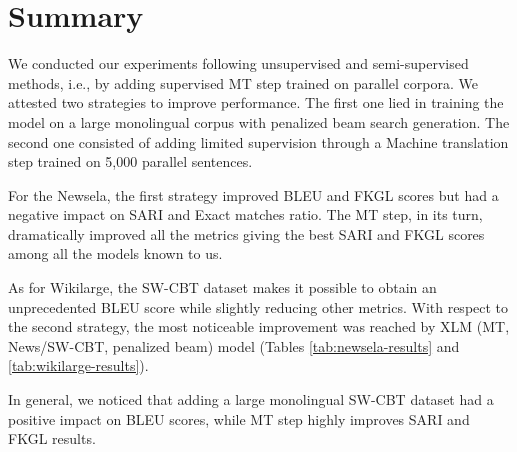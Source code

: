 \section{Summary}

We conducted our experiments following unsupervised and semi-supervised methods, i.e., by adding supervised MT step trained on parallel corpora. We attested two strategies to improve performance. The first one lied in training the model on a large monolingual corpus with penalized beam search generation. The second one consisted of adding limited supervision through a Machine translation step trained on 5,000 parallel sentences.

For the Newsela, the first strategy improved BLEU and FKGL scores but had a negative impact on SARI and Exact matches ratio. The MT step, in its turn, dramatically improved all the metrics giving the best SARI and FKGL scores among all the models known to us. 

As for Wikilarge, the SW-CBT dataset makes it possible to obtain an unprecedented BLEU score while slightly reducing other metrics. With respect to the second strategy, the most noticeable improvement was reached by XLM (MT, News/SW-CBT, penalized beam) model (Tables \ref{tab:newsela-results} and \ref{tab:wikilarge-results}).

In general, we noticed that adding a large monolingual SW-CBT dataset had a positive impact on BLEU scores, while MT step highly improves SARI and FKGL results.

\endinput